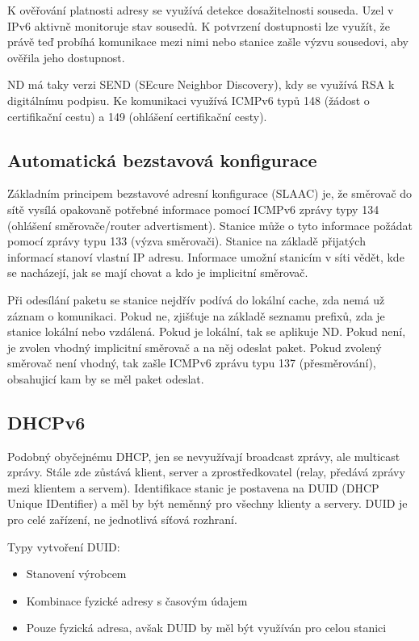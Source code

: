K ověřování platnosti adresy se využívá detekce dosažitelnosti souseda.
Uzel v IPv6 aktivně monitoruje stav sousedů.
K potvrzení dostupnosti lze využít, že právě teď probíhá komunikace mezi nimi nebo stanice zašle výzvu sousedovi, aby ověřila jeho dostupnost.

ND má taky verzi SEND (SEcure Neighbor Discovery), kdy se využívá RSA k digitálnímu podpisu.
Ke komunikaci využívá ICMPv6 typů 148 (žádost o certifikační cestu) a 149 (ohlášení certifikační cesty).

\subsection{Automatická bezstavová konfigurace}

Základním principem bezstavové adresní konfigurace (SLAAC) je, že směrovač do sítě vysílá opakovaně potřebné informace pomocí ICMPv6 zprávy typy 134 (ohlášení směrovače/router advertisment).
Stanice může o tyto informace požádat pomocí zprávy typu 133 (výzva směrovači).
Stanice na základě přijatých informací stanoví vlastní IP adresu.
Informace umožní stanicím v síti vědět, kde se nacházejí, jak se mají chovat a kdo je implicitní směrovač.


Při odesílání paketu se stanice nejdřív podívá do lokální cache, zda nemá už záznam o komunikaci.
Pokud ne, zjišťuje na základě seznamu prefixů, zda je stanice lokální nebo vzdálená.
Pokud je lokální, tak se aplikuje ND.
Pokud není, je zvolen vhodný implicitní směrovač a na něj odeslat paket.
Pokud zvolený směrovač není vhodný, tak zašle ICMPv6 zprávu typu 137 (přesměrování), obsahujicí kam by se měl paket odeslat.

\subsection{DHCPv6}

Podobný obyčejnému DHCP, jen se nevyužívají broadcast zprávy, ale multicast zprávy.
Stále zde zůstává klient, server a zprostředkovatel (relay, předává zprávy mezi klientem a servem).
Identifikace stanic je postavena na DUID (DHCP Unique IDentifier) a měl by být neměnný pro všechny klienty a servery.
DUID je pro celé zařízení, ne jednotlivá síťová rozhraní.

Typy vytvoření DUID:

\begin{itemize}[noitemsep]
    \item Stanovení výrobcem
    \item Kombinace fyzické adresy s časovým údajem
    \item Pouze fyzická adresa, avšak DUID by měl být využíván pro celou stanici
\end{itemize}


